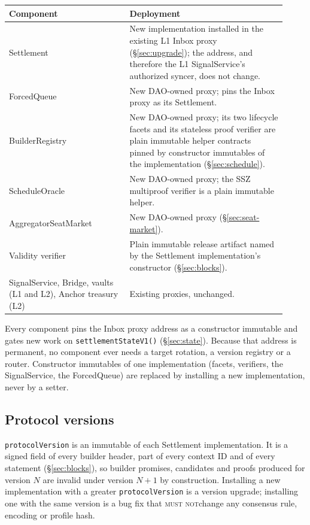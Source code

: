 \documentclass[a4paper,11pt]{article}
\newcommand{\code}[1]{\nolinkurl{#1}}
\newcommand{\mustnot}{\textsc{must not}}
\begin{document}
\begin{center}
\small
\begin{tabular}{p{0.40\linewidth}p{0.52\linewidth}}
\toprule
\textbf{Component} & \textbf{Deployment} \\
\midrule
Settlement & New implementation installed in the existing L1 Inbox proxy
  (\S\ref{sec:upgrade}); the address, and therefore the L1 SignalService's
  authorized syncer, does not change. \\
ForcedQueue & New DAO-owned proxy; pins the Inbox proxy as its Settlement. \\
BuilderRegistry & New DAO-owned proxy; its two lifecycle facets and its
  stateless proof verifier are plain immutable helper contracts pinned by
  constructor immutables of the implementation (\S\ref{sec:schedule}). \\
ScheduleOracle & New DAO-owned proxy; the SSZ multiproof verifier is a plain
  immutable helper. \\
AggregatorSeatMarket & New DAO-owned proxy (\S\ref{sec:seat-market}). \\
Validity verifier & Plain immutable release artifact named by the Settlement
  implementation's constructor (\S\ref{sec:blocks}). \\
SignalService, Bridge, vaults (L1 and L2), Anchor treasury (L2) & Existing
  proxies, unchanged. \\
\bottomrule
\end{tabular}
\end{center}

Every component pins the Inbox proxy address as a constructor immutable and
gates new work on \code{settlementStateV1()} (\S\ref{sec:state}).  Because
that address is permanent, no component ever needs a target rotation, a
version registry or a router.  Constructor immutables of one implementation
(facets, verifiers, the SignalService, the ForcedQueue) are replaced by
installing a new implementation, never by a setter.

\subsection{Protocol versions}

\code{protocolVersion} is an immutable of each Settlement implementation.  It
is a signed field of every builder header, part of every context ID and of
every statement (\S\ref{sec:blocks}), so builder promises, candidates and
proofs produced for version $N$ are invalid under version $N+1$ by
construction.  Installing a new implementation with a greater
\code{protocolVersion} is a version upgrade; installing one with the same
version is a bug fix that \mustnot change any consensus rule, encoding or
profile hash.
\end{document}
